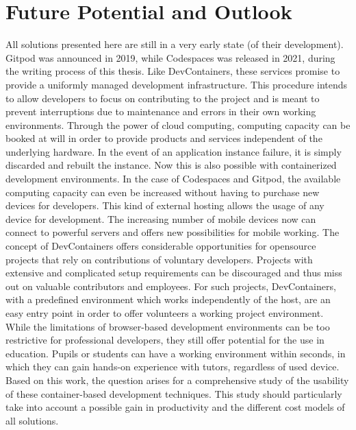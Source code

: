 
\section{Future Potential and Outlook}\label{sec::outlook}
All solutions presented here are still in a very early state (of their development). Gitpod was announced in 2019, while Codespaces was released in 2021, during the writing process of this thesis. Like DevContainers, these services promise to provide a uniformly managed development infrastructure. This procedure intends to allow developers to focus on contributing to the project and is meant to prevent interruptions due to maintenance and errors in their own working environments. Through the power of cloud computing, computing capacity can be booked at will in order to provide products and services independent of the underlying hardware. In the event of an application instance failure, it is simply discarded and rebuilt the instance. Now this is also possible with containerized development environments. In the case of Codespaces and Gitpod, the available computing capacity can even be increased without having to purchase new devices for developers. This kind of external hosting allows the usage of any device for development. The increasing number of mobile devices now can connect to powerful servers and offers new possibilities for mobile working.\newline
The concept of DevContainers offers considerable opportunities for opensource projects that rely on contributions of voluntary developers. Projects with extensive and complicated setup requirements can be discouraged and thus miss out on valuable contributors and employees. For such projects, DevContainers, with a predefined environment which works independently of the host, are an easy entry point in order to offer volunteers a working project environment. While the limitations of browser-based development environments can be too restrictive for professional developers, they still offer potential for the use in education. Pupils or students can have a working environment within seconds, in which they can gain hands-on experience with tutors, regardless of used device.\newline
Based on this work, the question arises for a comprehensive study of the usability of these container-based development techniques. This study should particularly take into account a possible gain in productivity and the different cost models of all solutions.

